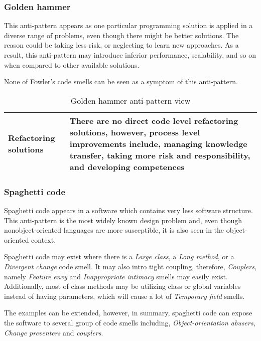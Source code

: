 \subsubsection*{Golden hammer}
This anti-pattern appears as one particular programming solution is applied in a diverse range of problems, even though there might be better solutions. The reason could be taking less risk, or neglecting to learn new approaches. As a result, this anti-pattern may introduce inferior performance, scalability, and so on when compared to other available solutions. 

None of Fowler's code smells can be seen as a symptom of this anti-pattern.

\begin{table}[ht!]
\centering
\caption{Golden hammer anti-pattern view}
\label{table:GoldenHammer}
    \begin{tabular}{ p{5cm} p{9cm} }
     \hline
     \textbf{Refactoring solutions}  &There are no direct code level refactoring solutions, however, process level improvements include, managing knowledge transfer, taking more risk and responsibility, and developing competences\\
     \hline
    \end{tabular}
\end{table}

\subsubsection*{Spaghetti code}
Spaghetti code appears in a software which contains very less software structure. This anti-pattern is the most widely known design problem and, even though nonobject-oriented languages are more susceptible, it is also seen in the object-oriented context.

Spaghetti code may exist where there is a \textit{Large class}, a \textit{Long method}, or a \textit{Divergent change} code smell. It may also intro tight coupling, therefore, \textit{Couplers}, namely \textit{Feature envy} and \textit{Inappropriate intimacy} smells may easily exist. Additionally, most of class methods may be utilizing class or global variables instead of having parameters, which will cause a lot of \textit{Temporary field} smells. 

The examples can be extended, however, in summary, spaghetti code can expose the software to several group of code smells including, \textit{Object-orientation abusers, Change preventers} and \textit{couplers}.

